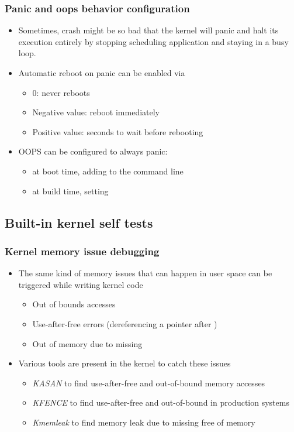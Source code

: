 \begin{frame}
  \frametitle{Panic and oops behavior configuration}
  \begin{itemize}
    \item Sometimes, crash might be so bad that the kernel will panic and halt
          its execution entirely by stopping scheduling application and staying
          in a busy loop.
    \item Automatic reboot on panic can be enabled via
    \begin{itemize}
      \item 0: never reboots
      \item Negative value: reboot immediately
      \item Positive value: seconds to wait before rebooting
    \end{itemize}
    \item OOPS can be configured to always panic:
    \begin{itemize}
      \item at boot time, adding  to the command line
      \item at build time, setting 
    \end{itemize}
  \end{itemize}
\end{frame}

\subsection{Built-in kernel self tests}

\begin{frame}
  \frametitle{Kernel memory issue debugging}
  \begin{itemize}
    \item The same kind of memory issues that can happen in user space can be
          triggered while writing kernel code
    \begin{itemize}
      \item Out of bounds accesses
      \item Use-after-free errors (dereferencing a pointer after )
      \item Out of memory due to missing 
    \end{itemize}
    \item Various tools are present in the kernel to catch these issues
    \begin{itemize}
      \item {\em KASAN} to find use-after-free and out-of-bound memory accesses
      \item {\em KFENCE} to find use-after-free and out-of-bound in production systems
      \item {\em Kmemleak} to find memory leak due to missing free of memory
    \end{itemize}
  \end{itemize}
\end{frame}

